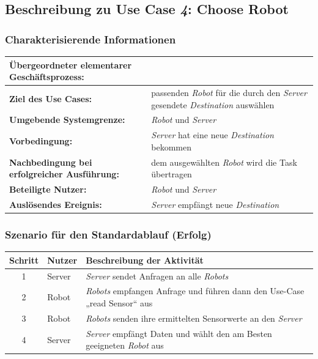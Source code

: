 \documentclass[includeheaders]{scrartcl}
\begin{document}

		\subsection{Beschreibung zu Use Case \emph{4}: Choose Robot}

			\subsubsection*{Charakterisierende Informationen}

			\begin{table}[H]
				\centering
				\begin{tabularx}{\textwidth}{@{}p{5cm}X@{}}
				\toprule
				\textbf{Übergeordneter elementarer Geschäftsprozess:} & \\ \midrule
				\textbf{Ziel des Use Cases:} & passenden \emph{Robot} für die durch den \emph{Server} gesendete \emph{Destination} auswählen\\ \midrule
				\textbf{Umgebende Systemgrenze:} & \emph{Robot} und \emph{Server} \\ \midrule
				\textbf{Vorbedingung:} & \emph{Server} hat eine neue \emph{Destination} bekommen\\ \midrule
				\textbf{Nachbedingung bei erfolgreicher Ausführung:} & dem ausgewählten \emph{Robot} wird die Task übertragen\\ \midrule
				\textbf{Beteiligte Nutzer:} & \emph{Robot} und \emph{Server}\\ \midrule
				\textbf{Auslösendes Ereignis:} & \emph{Server} empfängt neue \emph{Destination}\\
				\bottomrule
				\end{tabularx}
			\end{table}

			\subsubsection*{Szenario für den Standardablauf (Erfolg)}

			\begin{table}[H]
				\centering
				\begin{tabularx}{\textwidth}{@{}cp{2cm}X@{}}
				\toprule
				Schritt & Nutzer & Beschreibung der Aktivität \\ \midrule
				1 & Server & \emph{Server} sendet Anfragen an alle \emph{Robots} \\
				2 & Robot & \emph{Robots} empfangen Anfrage und führen dann den Use-Case „read Sensor“ aus \\
				3 & Robot & \emph{Robots} senden ihre ermittelten Sensorwerte an den \emph{Server}\\
				4 & Server & \emph{Server} empfängt Daten und wählt den am Besten geeigneten \emph{Robot} aus \\
				\bottomrule
				\end{tabularx}
			\end{table}
\end{document}
